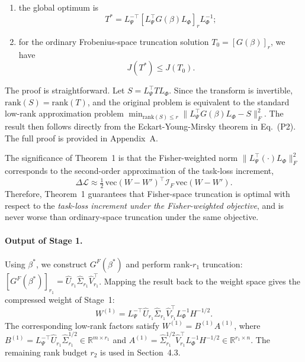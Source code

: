 \documentclass[a4paper,fleqn]{cas-dc}
\begin{document}
\begin{enumerate}[leftmargin=1.5em,label=(\arabic*)]
    \item the global optimum is
    \begin{equation}
    T^* = L_\Psi^{-\top}[L_\Psi^\top G(\beta)L_\Phi]_r L_\Phi^{-1};
    \tag{3}
    \end{equation}
    \item for the ordinary Frobenius-space truncation solution $T_0 = [G(\beta)]_r$, we have
    \begin{equation}
    J(T^*) \le J(T_0).
    \end{equation}
\end{enumerate}

The proof is straightforward. Let $S = L_\Psi^\top T L_\Phi$. Since the transform is invertible, $\mathrm{rank}(S) = \mathrm{rank}(T)$, and the original problem is equivalent to the standard low-rank approximation problem $\min_{\mathrm{rank}(S) \le r} \|L_\Psi^\top G(\beta)L_\Phi - S\|_F^2$. The result then follows directly from the Eckart-Young-Mirsky theorem in Eq.~(P2). The full proof is provided in Appendix~A.

The significance of Theorem~1 is that the Fisher-weighted norm $\|L_\Psi^\top (\cdot)L_\Phi\|_F^2$ corresponds to the second-order approximation of the task-loss increment,
\begin{equation}
\Delta \mathcal{L} \approx \tfrac{1}{2}\, \mathrm{vec}(W-W')^\top \mathcal{I}_F \, \mathrm{vec}(W-W').
\end{equation}
Therefore, Theorem~1 guarantees that Fisher-space truncation is optimal with respect to the \emph{task-loss increment under the Fisher-weighted objective}, and is never worse than ordinary-space truncation under the same objective.

\paragraph{Output of Stage 1.}
Using $\beta^*$, we construct $G^F(\beta^*)$ and perform rank-$r_1$ truncation:
$[G^F(\beta^*)]_{r_1} = \hat{U}_{r_1}\hat{\Sigma}_{r_1}\hat{V}_{r_1}^\top$.
Mapping the result back to the weight space gives the compressed weight of Stage~1:
\begin{equation}
W^{(1)} = L_\Psi^{-\top} \hat{U}_{r_1}\hat{\Sigma}_{r_1}\hat{V}_{r_1}^\top L_\Phi^{-1} H^{-1/2}.
\tag{4}
\end{equation}
The corresponding low-rank factors satisfy $W^{(1)} = B^{(1)}A^{(1)}$, where $B^{(1)} = L_\Psi^{-\top}\hat{U}_{r_1}\hat{\Sigma}_{r_1}^{1/2} \in \mathbb{R}^{m \times r_1}$ and $A^{(1)} = \hat{\Sigma}_{r_1}^{1/2}\hat{V}_{r_1}^\top L_\Phi^{-1} H^{-1/2} \in \mathbb{R}^{r_1 \times n}$. The remaining rank budget $r_2$ is used in Section~4.3.
\end{document}
